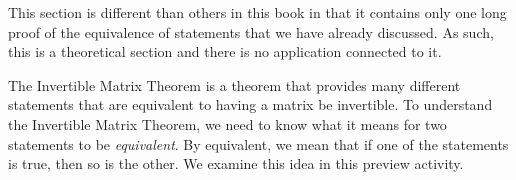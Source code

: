  \label{sec:IMT}

\vspace*{-17 pt}

\vspace*{13 pt}



This section is different than others in this book in that it contains only one long proof of the equivalence of statements that we have already discussed. As such, this is a theoretical section and there is no application connected to it. 

The Invertible Matrix Theorem is a theorem that provides many different statements that are equivalent to having a matrix be invertible. To understand the Invertible Matrix Theorem, we need to know what it means for two statements to be \emph{equivalent}. By equivalent, we mean that if one of the statements is true, then so is the other. We examine this idea in this preview activity.

